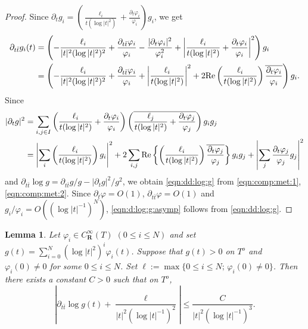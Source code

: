 \documentclass[amscd, leqno]{amsart}
\theoremstyle{plain}
\newtheorem{lemma}[theorem]{Lemma}
\theoremstyle{definition}
\theoremstyle{remark}
\newenvironment{pf}{\begin{proof}}{\end{proof}}
\begin{document}
\begin{pf}
Since $\partial_{t} g_{i} = \left( \frac{\ell_{i}}{t(\log|t|^{2})}+\frac{\partial_{t}\varphi_{i}}{\varphi_{i}} \right) g_{i}$, we get 
\begin{equation}
\label{eqn:comp:met:1}
\begin{aligned}
\partial_{t\bar{t}} g_{i}(t)
&=
\left( -\frac{\ell_{i}}{|t|^{2}(\log|t|^{2})^{2}} 
+ \frac{\partial_{t\bar{t}}\varphi_{i}}{\varphi_{i}} -\frac{|\partial_{t}\varphi_{i}|^{2}}{\varphi_{i}^{2}}
+
\left| \frac{\ell_{i}}{t(\log|t|^{2})} + \frac{\partial_{t}\varphi_{i}}{\varphi_{i}} \right|^{2} \right) g_{i}
\\
&=
\left( 
-\frac{\ell_{i}}{|t|^{2}(\log|t|^{2})^{2}} + \frac{\partial_{t\bar{t}}\varphi_{i}}{\varphi_{i}}
+
\left| \frac{\ell_{i}}{t(\log|t|^{2})} \right|^{2} 
+
2{\rm Re}\left( \frac{\ell_{i}}{t(\log|t|^{2})} \right) \overline{\frac{\partial_{t}\varphi_{i}}{\varphi_{i}}}
\right) g_{i}.
\end{aligned}
\end{equation}
Since
\begin{equation}
\label{eqn:comp:met:2}
\begin{aligned}
|\partial_{t}g|^{2}
&=
\sum_{i,j\in I}
\left(
\frac{\ell_{i}}{t(\log|t|^{2})} + \frac{\partial_{t}\varphi_{i}}{\varphi_{i}}
\right)
\left(
\overline{\frac{\ell_{j}}{t(\log|t|^{2})}+\frac{\partial_{t}\varphi_{j}}{\varphi_{j}}}
\right)
g_{i}g_{j}
\\
&=
\left| \sum_{i} \left( \frac{\ell_{i}}{t(\log|t|^{2})} \right) g_{i} \right|^{2}
+
2 \sum_{i,j} {\rm Re} \left\{ \left(\frac{\ell_{i}}{t(\log|t|^{2})} \right) \overline{\frac{\partial_{t}\varphi_{j}}{\varphi_{j}}} \right\} g_{i}g_{j}
+
\left| \sum_{j} \frac{\partial_{t}\varphi_{j}}{\varphi_{j}} g_{j} \right|^{2}
\end{aligned}
\end{equation}
and $\partial_{t\bar{t}}\log g = \partial_{t\bar{t}}g/g - |\partial_{t}g|^{2}/g^{2}$, 
we obtain \eqref{eqn:dd:log:g} from \eqref{eqn:comp:met:1}, \eqref{eqn:comp:met:2}.
Since $\partial_{t}\varphi = O(1)$, $\partial_{t\bar{t}} \varphi = O(1)$ and $g_{i}/\varphi_{i} = O( (\log|t|^{-1})^{N} )$, 
\eqref{eqn:d:log:g:asymp} follows from \eqref{eqn:dd:log:g}.
\end{pf}


\begin{lemma}
\label{lemma:Mumf:good}
Let $\varphi_{i}\in C^{\infty}_{\mathbf R}(T)$ $(0\leq i \leq N)$ and set $g(t)=\sum_{i=0}^{N}(\log|t|^{2})^{i}\varphi_{i}(t)$.
Suppose that $g(t)>0$ on $T^{o}$ and $\varphi_{i}(0)\not=0$ for some $0\leq i\leq N$. Set 
$\ell := \max\{0\leq i\leq N;\,\varphi_{i}(0)\not=0\}$.
Then there exists a constant $C>0$ such that on $T^{o}$,
$$
\left|
\partial_{t\bar{t}}\log g(t)
+
\frac{\ell}{|t|^{2}(\log |t|^{-1} )^{2}}
\right|
\leq
\frac{C}{|t|^{2}( \log |t|^{-1} )^{3}}.
$$
\end{lemma}
\end{document}
